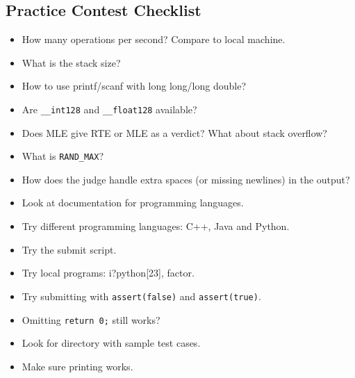 \documentclass[9pt,a4paper,landscape,oneside]{amsart}
\newenvironment{myitemize}
{\begin{itemize}[leftmargin=.3cm]
	\setlength{\itemsep}{0pt}
	\setlength{\parskip}{0pt}
	\setlength{\parsep}{0pt}     }
{ \end{itemize}                  }
\begin{document}
\begin{multicols*}{3}
\vspace{3em}
\section*{Practice Contest Checklist}
\begin{myitemize}
	\item How many operations per second? Compare to local machine.
	\item What is the stack size?
	\item How to use printf/scanf with long long/long double?
	\item Are \texttt{\_{}\_{}int128} and \texttt{\_{}\_{}float128} available?
	\item Does MLE give RTE or MLE as a verdict? What about stack overflow?
	\item What is \texttt{RAND\_{}MAX}?
	\item How does the judge handle extra spaces (or missing newlines) in the output?
	\item Look at documentation for programming languages.
	\item Try different programming languages: C++, Java and Python.
	\item Try the submit script.
	\item Try local programs: i?python[23], factor.
	\item Try submitting with \texttt{assert(false)} and \texttt{assert(true)}.
	\item Omitting \texttt{return 0;} still works?
	\item Look for directory with sample test cases.
	\item Make sure printing works.
\end{myitemize}

\label{LastPage}
\end{multicols*}
\end{document}
